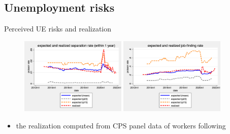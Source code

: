 \documentclass{beamer}
\begin{document}

\subsection{Unemployment risks}
\begin{frame}{Perceived UE risks and realization}
	\begin{figure}
		\centering
		\label{ue_expectations}
		\includegraphics[width=0.45\textwidth]{figures/separation_rate_1y.png} 
		\hfill
		\includegraphics[width=0.45\textwidth]{figures/job_finding_rate.png} 
	\end{figure}
	\begin{itemize}
		\item the realization computed from CPS panel data of workers following \cite{fujita2009cyclicality}
	\end{itemize}
\end{frame}
\end{document}
